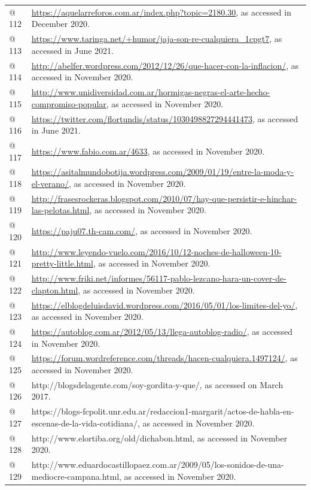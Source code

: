 \documentclass[10pt]{article}
\begin{document}
\begin{flushleft}
\begin{supertabular}{m{0.7955598in}m{5.35876in}}
@ 112  &
\url{https://aquelarreforos.com.ar/index.php?topic=2180.30}, as accessed in December 2020.\\
@ 113  &
\url{https://www.taringa.net/+humor/jaja-son-re-cualquiera_1cpgt7}, as accessed in June 2021.\\
@ 114  &
\url{http://abelfer.wordpress.com/2012/12/26/que-hacer-con-la-inflacion/}, as accessed in November 2020.\\
@ 115  &
\url{http://www.unidiversidad.com.ar/hormigas-negras-el-arte-hecho-compromiso-popular}, as accessed in November 2020.\\
@ 116  &
\url{https://twitter.com/flortundis/status/1030498827294441473}, as accessed in June 2021.\\
@ 117  &
\url{https://www.fabio.com.ar/4633}, as accessed in November 2020.\\
@ 118  &
\url{https://asitalmundobotija.wordpress.com/2009/01/19/entre-la-moda-y-el-verano/}, as accessed in November 2020.\\
@ 119  &
\url{http://frasesrockeras.blogspot.com/2010/07/hay-que-persistir-e-hinchar-las-pelotas.html}, as accessed in November 2020.\\
@ 120  &
\url{https://paju07.th-cam.com/}, as accessed in November 2020.\\
@ 121  &
\url{http://www.leyendo-vuelo.com/2016/10/12-noches-de-halloween-10-pretty-little.html}, as accessed in November 2020.\\
@ 122  &
\url{http://www.friki.net/informes/56117-pablo-lezcano-hara-un-cover-de-clapton.html}, as accessed in November 2020.\\
@ 123  &
\url{https://elblogdeluisdavid.wordpress.com/2016/05/01/los-limites-del-yo/}, as accessed in November 2020.\\
@ 124  &
\url{https://autoblog.com.ar/2012/05/13/llega-autoblog-radio/}, as accessed in November 2020.\\
@ 125  &
\url{https://forum.wordreference.com/threads/hacen-cualquiera.1497124/}, as accessed in November 2020.\\
@ 126  &
http://blogsdelagente.com/soy-gordita-y-que/, as accessed on March 2017.\\
@ 127  &
https://blogs-fcpolit.unr.edu.ar/redaccion1-margarit/actos-de-habla-en-escenas-de-la-vida-cotidiana/, as accessed in November 2020.\\
@ 128  &
http://www.elortiba.org/old/dichabon.html, as accessed in November 2020.\\
@ 129  &
http://www.eduardocastillopaez.com.ar/2009/05/los-sonidos-de-una-mediocre-campana.html, as accessed in November 2020.\\

\end{supertabular}
\end{flushleft}
\end{document}
